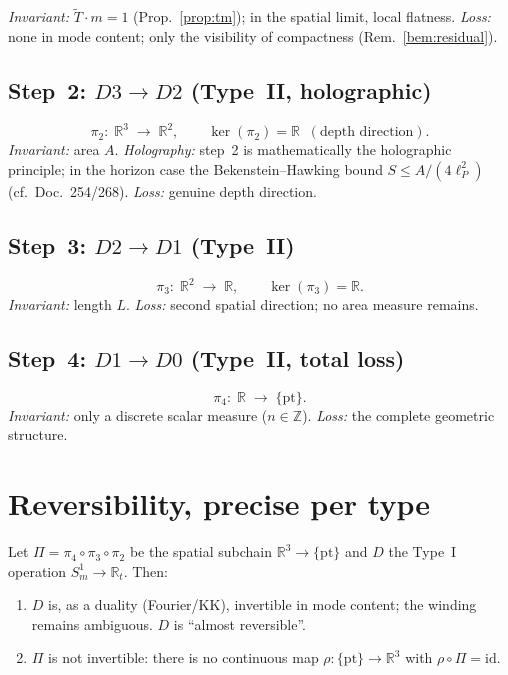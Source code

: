 \textit{Invariant:} $\tilde{T}\cdot m = 1$ (Prop.~\ref{prop:tm}); in the spatial
limit, local flatness.\quad
\textit{Loss:} none in mode content; only the visibility of compactness
(Rem.~\ref{bem:residual}).

\subsection{Step~2: $D3 \to D2$ (Type~II, holographic)}
\[
  \pi_2:\; \mathbb{R}^3 \;\longrightarrow\; \mathbb{R}^2,
  \qquad \ker(\pi_2) = \mathbb{R}\;\;(\text{depth direction}).
\]
\textit{Invariant:} area $A$.\quad
\textit{Holography:} step~2 is mathematically the holographic principle; in the
horizon case the Bekenstein--Hawking bound $S \le A/(4\ell_P^2)$ (cf.\
Doc.~254/268).\quad
\textit{Loss:} genuine depth direction.

\subsection{Step~3: $D2 \to D1$ (Type~II)}
\[
  \pi_3:\; \mathbb{R}^2 \;\longrightarrow\; \mathbb{R},
  \qquad \ker(\pi_3) = \mathbb{R}.
\]
\textit{Invariant:} length $L$.\quad
\textit{Loss:} second spatial direction; no area measure remains.

\subsection{Step~4: $D1 \to D0$ (Type~II, total loss)}
\[
  \pi_4:\; \mathbb{R} \;\longrightarrow\; \{\mathrm{pt}\}.
\]
\textit{Invariant:} only a discrete scalar measure ($n\in\mathbb{Z}$).\quad
\textit{Loss:} the complete geometric structure.

\section{Reversibility, precise per type}

\begin{theorem}\label{satz:rev}
Let $\Pi = \pi_4\circ\pi_3\circ\pi_2$ be the spatial subchain
$\mathbb{R}^3 \to \{\mathrm{pt}\}$ and $D$ the Type~I operation
$S^1_m \to \mathbb{R}_t$. Then:
\begin{enumerate}
  \item[(i)] $D$ is, as a duality (Fourier/KK), invertible in mode content; the
  winding remains ambiguous. $D$ is ``almost reversible''.
  \item[(ii)] $\Pi$ is not invertible: there is no continuous map
  $\rho:\{\mathrm{pt}\}\to\mathbb{R}^3$ with $\rho\circ\Pi=\mathrm{id}$.
\end{enumerate}
\end{theorem}

